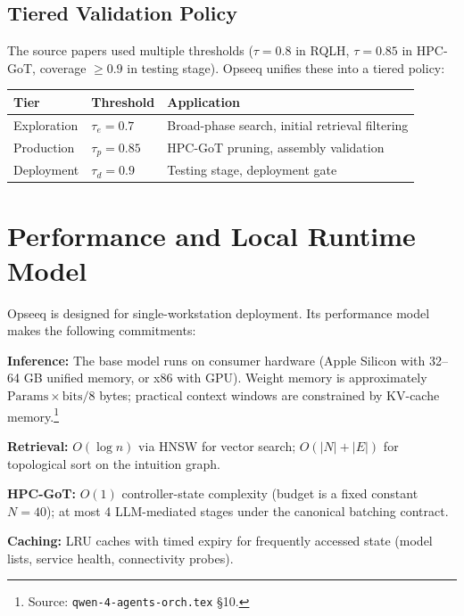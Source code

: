 \documentclass[11pt]{article}
\theoremstyle{remark}
\begin{document}
\subsection{Tiered Validation Policy}
\label{subsec:tiered_validation}

The source papers used multiple thresholds ($\tau = 0.8$ in RQLH, $\tau = 0.85$ in HPC-GoT, coverage $\ge 0.9$ in testing stage). Opseeq unifies these into a tiered policy:

\begin{center}
\begin{tabular}{lll}
\toprule
\textbf{Tier} & \textbf{Threshold} & \textbf{Application} \\
\midrule
Exploration & $\tau_e = 0.7$ & Broad-phase search, initial retrieval filtering \\
Production & $\tau_p = 0.85$ & HPC-GoT pruning, assembly validation \\
Deployment & $\tau_d = 0.9$ & Testing stage, deployment gate \\
\bottomrule
\end{tabular}
\end{center}

\section{Performance and Local Runtime Model}
\label{sec:performance}

Opseeq is designed for single-workstation deployment. Its performance model makes the following commitments:

\textbf{Inference:} The base model runs on consumer hardware (Apple Silicon with 32--64 GB unified memory, or x86 with GPU). Weight memory is approximately $\mathrm{Params} \times \mathrm{bits}/8$ bytes; practical context windows are constrained by KV-cache memory.\footnote{Source: \texttt{qwen-4-agents-orch.tex} \S10.}

\textbf{Retrieval:} $O(\log n)$ via HNSW for vector search; $O(|N| + |E|)$ for topological sort on the intuition graph.

\textbf{HPC-GoT:} $O(1)$ controller-state complexity (budget is a fixed constant $N = 40$); at most 4 LLM-mediated stages under the canonical batching contract.

\textbf{Caching:} LRU caches with timed expiry for frequently accessed state (model lists, service health, connectivity probes).
\end{document}
